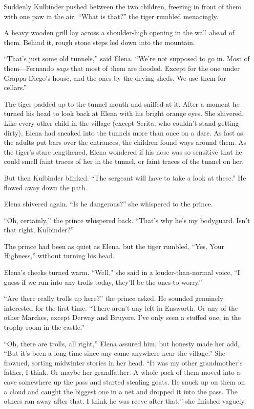 \documentclass[10pt]{book}
\begin{document}
Suddenly Kulbinder pushed between the two children, freezing in front of them with one paw in the air. ``What is that?'' the tiger rumbled menacingly.

A heavy wooden grill lay across a shoulder-high opening in the wall ahead of them. Behind it, rough stone steps led down into the mountain.

``That's just some old tunnels,'' said Elena. ``We're not supposed to go in. Most of them---Fernando \emph{says} that most of them are flooded. Except for the one under Grappa Diego's house, and the ones by the drying sheds. We use them for cellars.''

The tiger padded up to the tunnel mouth and sniffed at it. After a moment he turned his head to look back at Elena with his bright orange eyes. She shivered. Like every other child in the village (except Serita, who couldn't stand getting dirty), Elena had sneaked into the tunnels more than once on a dare. As fast as the adults put bars over the entrances, the children found ways around them. As the tiger's stare lengthened, Elena wondered if his nose was so sensitive that he could smell faint traces of her in the tunnel, or faint traces of the tunnel on her.

But then Kulbinder blinked. ``The sergeant will have to take a look at these.'' He flowed away down the path.

Elena shivered again. ``Is he dangerous?'' she whispered to the prince.

``Oh, certainly,'' the prince whispered back. ``That's why he's my bodyguard. Isn't that right, Kulbinder?''

The prince had been as quiet as Elena, but the tiger rumbled, ``Yes, Your Highness,'' without turning his head.

Elena's cheeks turned warm. ``Well,'' she said in a louder-than-normal voice, ``I guess if we run into any trolls today, they'll be the ones to worry.''

``Are there really trolls up here?'' the prince asked. He sounded genuinely interested for the first time. ``There aren't any left in Ensworth. Or any of the other Marches, except Derway and Bruyere. I've only seen a stuffed one, in the trophy room in the castle.''

``Oh, there are trolls, all right,'' Elena assured him, but honesty made her add, ``But it's been a long time since any came anywhere near the village.'' She frowned, sorting midwinter stories in her head. ``It was my other grandmother's father, I think. Or maybe her grandfather. A whole pack of them moved into a cave somewhere up the pass and started stealing goats. He snuck up on them on a cloud and caught the biggest one in a net and dropped it into the pass. The others ran away after that. I think he was reeve after that,'' she finished vaguely.
\end{document}
